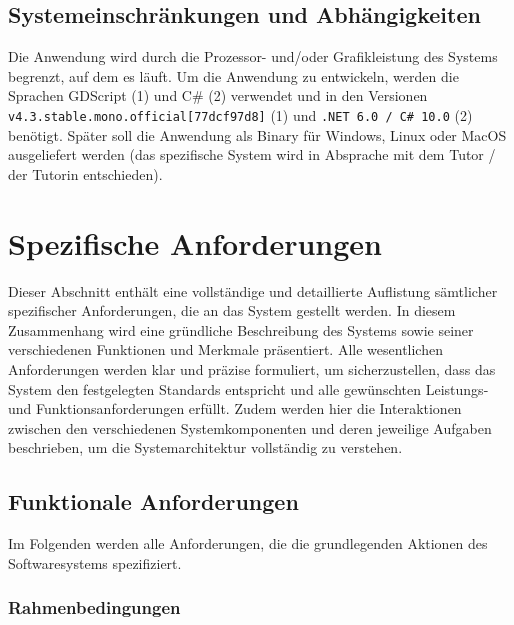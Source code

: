 \documentclass[10pt]{article}
\begin{document}
\subsection{Systemeinschränkungen und Abhängigkeiten}

Die Anwendung wird durch die Prozessor- und/oder Grafikleistung des Systems begrenzt, auf dem es läuft. Um die Anwendung zu entwickeln, werden die Sprachen GDScript (1) und C\# (2) verwendet und in den Versionen \texttt{v4.3.stable.mono.official[77dcf97d8]} (1) und \texttt{.NET 6.0 / C\# 10.0} (2) benötigt. Später soll die Anwendung als Binary für Windows, Linux oder MacOS ausgeliefert werden (das spezifische System wird in Absprache mit dem Tutor / der Tutorin entschieden).

    \section{Spezifische Anforderungen}

  	Dieser Abschnitt enthält eine vollständige und detaillierte Auflistung sämtlicher spezifischer Anforderungen, die an das System gestellt werden. In 		diesem Zusammenhang wird eine gründliche Beschreibung des Systems sowie seiner verschiedenen Funktionen und Merkmale präsentiert. Alle wesentlichen 		Anforderungen werden klar und präzise formuliert, um sicherzustellen, dass das System den festgelegten Standards entspricht und alle gewünschten 			Leistungs- und Funktionsanforderungen erfüllt. Zudem werden hier die Interaktionen zwischen den verschiedenen Systemkomponenten und deren jeweilige 		Aufgaben beschrieben, um die Systemarchitektur vollständig zu verstehen.

    \subsection{Funktionale Anforderungen}

    Im Folgenden werden alle Anforderungen, die die grundlegenden Aktionen des Softwaresystems spezifiziert.
    
    	\subsubsection{Rahmenbedingungen}
    
	
\end{document}
